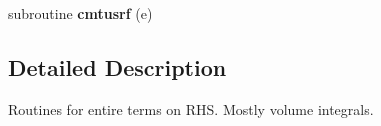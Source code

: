 \begin{DoxyCompactItemize}
\item 
\hypertarget{eqnsolver__cmt_8f_aa10e48ce3eda6377da8f35c3287fc72c}{subroutine {\bfseries cmtusrf} (e)}\label{eqnsolver__cmt_8f_aa10e48ce3eda6377da8f35c3287fc72c}

\end{DoxyCompactItemize}


\subsection{Detailed Description}
Routines for entire terms on R\-H\-S. Mostly volume integrals. 